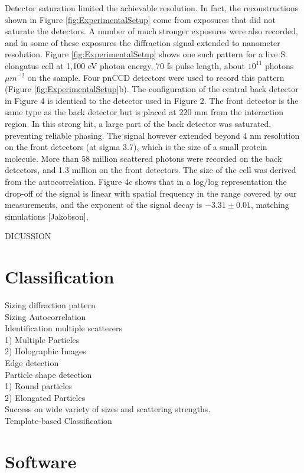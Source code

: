Detector saturation limited the achievable resolution.  In fact, the reconstructions shown in Figure \ref{fig:ExperimentalSetup} come from exposures that did not saturate the detectors. A number of much stronger exposures were also recorded, and in some of these exposures the diffraction signal extended to nanometer resolution. Figure \ref{fig:ExperimentalSetup} shows one such pattern for a live S. elongatus cell at 1,100 eV photon energy, 70 fs pulse length, about $10^11$ photons $\mu m^{-2}$ on the sample. Four pnCCD detectors were used to record this pattern (Figure \ref{fig:ExperimentalSetup}b). The configuration of the central back detector in Figure 4 is identical to the detector used in Figure 2. The front detector is the same type as the back detector but is placed at 220 mm from the interaction region. In this strong hit, a large part of the back detector was saturated, preventing reliable phasing. The signal however extended beyond 4 nm resolution on the front detectors (at sigma 3.7), which is the size of a small protein molecule. More than 58 million scattered photons were recorded on the back detectors, and 1.3 million on the front detectors. The size of the cell was derived from the autocorrelation. Figure 4c shows that in a log/log representation the drop-off of the signal is linear with spatial frequency in the range covered by our measurements, and the exponent of the signal decay is $-3.31\pm0.01$, matching simulations [Jakobson].

DICUSSION 

\section{Classification}

Sizing diffraction pattern
\\
Sizing Autocorrelation
\\
Identification multiple scatterers
\\	1) Multiple Particles
\\	2) Holographic Images
\\
Edge detection
\\
Particle shape detection
\\	1) Round particles
\\	2) Elongated Particles
\\
Success on wide variety of sizes and scattering strengths.
\\
Template-based Classification
\\

\section{Software}
